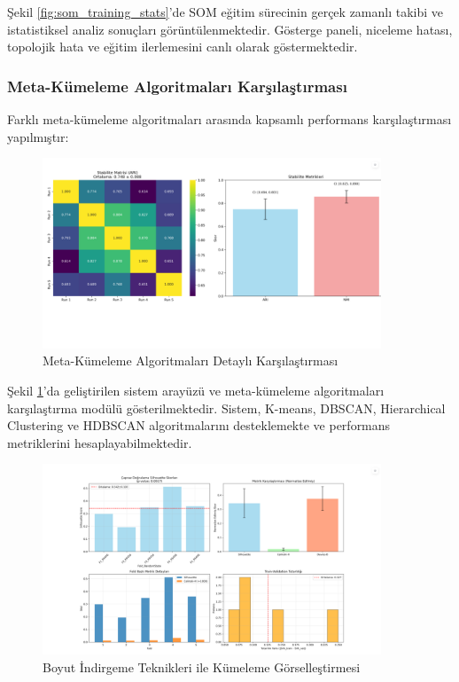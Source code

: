 \newpage

Şekil \ref{fig:som_training_stats}'de SOM eğitim sürecinin gerçek zamanlı takibi ve istatistiksel analiz sonuçları görüntülenmektedir. Gösterge paneli, niceleme hatası, topolojik hata ve eğitim ilerlemesini canlı olarak göstermektedir.

\subsubsection{Meta-Kümeleme Algoritmaları Karşılaştırması}

Farklı meta-kümeleme algoritmaları arasında kapsamlı performans karşılaştırması yapılmıştır:

\begin{figure}[!ht]
    \centering
    \includegraphics[width=0.9\textwidth]{images/meta-kumeleme-karsilastirmasi.png}
    \caption{Meta-Kümeleme Algoritmaları Detaylı Karşılaştırması}
    \label{fig:meta_algorithms_comparison}
\end{figure}

Şekil \ref{fig:meta_algorithms_comparison}'da geliştirilen sistem arayüzü ve meta-kümeleme algoritmaları karşılaştırma modülü gösterilmektedir. Sistem, K-means, DBSCAN, Hierarchical Clustering ve HDBSCAN algoritmalarını desteklemekte ve performans metriklerini hesaplayabilmektedir.

\begin{figure}[!ht]
    \centering
    \includegraphics[width=0.9\textwidth]{images/boyut-indirgeme-gorsellestirilmesi.png}
    \caption{Boyut İndirgeme Teknikleri ile Kümeleme Görselleştirmesi}
    \label{fig:dimensionality_reduction}
\end{figure}

